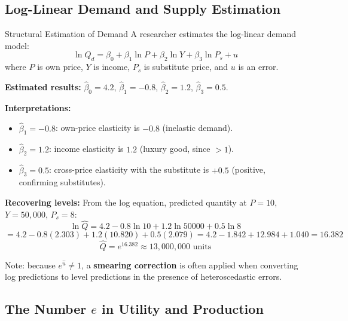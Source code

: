 \documentclass[12pt, a4paper]{article}
\theoremstyle{definition}
\begin{document}
\subsection{Log-Linear Demand and Supply Estimation}

\begin{exbox}{Structural Estimation of Demand}
A researcher estimates the log-linear demand model:
\[
  \ln Q_d = \beta_0 + \beta_1\ln P + \beta_2\ln Y + \beta_3\ln P_s + u
\]
where $P$ is own price, $Y$ is income, $P_s$ is substitute price, and $u$ is an error.

\textbf{Estimated results:}
$\hat\beta_0 = 4.2$, $\hat\beta_1 = -0.8$, $\hat\beta_2 = 1.2$, $\hat\beta_3 = 0.5$.

\textbf{Interpretations:}
\begin{itemize}
  \item $\hat\beta_1 = -0.8$: own-price elasticity is $-0.8$ (inelastic demand).
  \item $\hat\beta_2 = 1.2$: income elasticity is $1.2$ (luxury good, since $>1$).
  \item $\hat\beta_3 = 0.5$: cross-price elasticity with the substitute is $+0.5$ (positive, confirming substitutes).
\end{itemize}

\textbf{Recovering levels:}
From the log equation, predicted quantity at $P=10$, $Y=50{,}000$, $P_s=8$:
\[
  \ln\hat Q = 4.2 - 0.8\ln 10 + 1.2\ln 50000 + 0.5\ln 8
\]
\[
  = 4.2 - 0.8(2.303) + 1.2(10.820) + 0.5(2.079)
  = 4.2 - 1.842 + 12.984 + 1.040 = 16.382
\]
\[
  \hat Q = e^{16.382} \approx 13{,}000{,}000 \text{ units}
\]

Note: because $e^{\hat u} \neq 1$, a \textbf{smearing correction} is often applied when converting log predictions to level predictions in the presence of heteroscedastic errors.
\end{exbox}

\subsection{The Number $e$ in Utility and Production}
\end{document}
